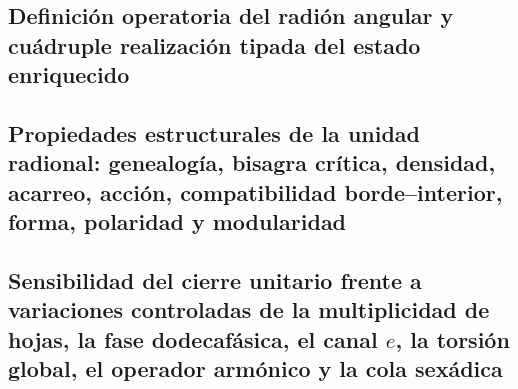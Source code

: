 \subsection{Definición operatoria del radión angular y cuádruple realización tipada del estado enriquecido}


\subsection{Propiedades estructurales de la unidad radional: genealogía, bisagra crítica, densidad, acarreo, acción, compatibilidad borde--interior, forma, polaridad y modularidad}

\subsection{Sensibilidad del cierre unitario frente a variaciones controladas de la multiplicidad de hojas, la fase dodecafásica, el canal \(e\), la torsión global, el operador armónico y la cola sexádica}

